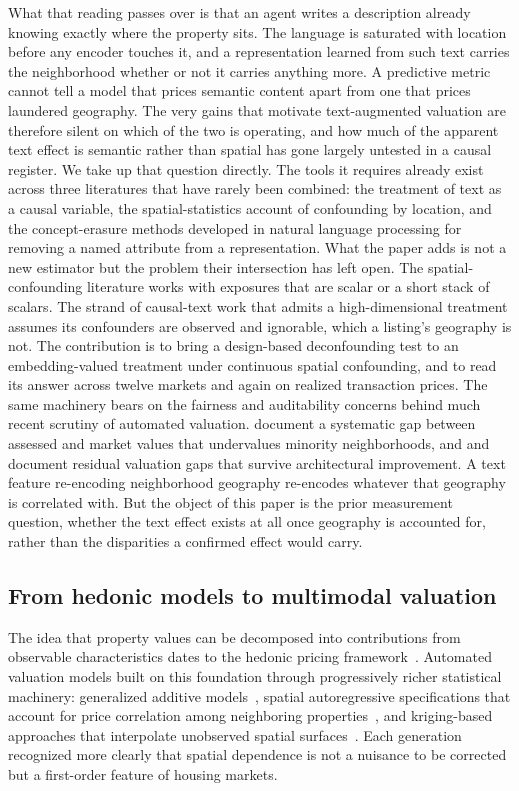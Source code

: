 \documentclass{article}
\begin{document}
What that reading passes over is that an agent writes a description already knowing exactly where the property sits. The language is saturated with location before any encoder touches it, and a representation learned from such text carries the neighborhood whether or not it carries anything more. A predictive metric cannot tell a model that prices semantic content apart from one that prices laundered geography. The very gains that motivate text-augmented valuation are therefore silent on which of the two is operating, and how much of the apparent text effect is semantic rather than spatial has gone largely untested in a causal register. We take up that question directly. The tools it requires already exist across three literatures that have rarely been combined: the treatment of text as a causal variable, the spatial-statistics account of confounding by location, and the concept-erasure methods developed in natural language processing for removing a named attribute from a representation. What the paper adds is not a new estimator but the problem their intersection has left open. The spatial-confounding literature works with exposures that are scalar or a short stack of scalars. The strand of causal-text work that admits a high-dimensional treatment assumes its confounders are observed and ignorable, which a listing's geography is not. The contribution is to bring a design-based deconfounding test to an embedding-valued treatment under continuous spatial confounding, and to read its answer across twelve markets and again on realized transaction prices. The same machinery bears on the fairness and auditability concerns behind much recent scrutiny of automated valuation. \citet{avenancio2022assessment} document a systematic gap between assessed and market values that undervalues minority neighborhoods, and \citet{zhu2024racial} and \citet{guo2025racial} document residual valuation gaps that survive architectural improvement. A text feature re-encoding neighborhood geography re-encodes whatever that geography is correlated with. But the object of this paper is the prior measurement question, whether the text effect exists at all once geography is accounted for, rather than the disparities a confirmed effect would carry.

\subsection{From hedonic models to multimodal valuation}

The idea that property values can be decomposed into contributions from observable characteristics dates to the hedonic pricing framework~\citep{rosen1974hedonic,sheppard1999hedonic}. Automated valuation models built on this foundation through progressively richer statistical machinery: generalized additive models~\citep{gloudemans1999mass}, spatial autoregressive specifications that account for price correlation among neighboring properties~\citep{pace1998sparse,can1992specification}, and kriging-based approaches that interpolate unobserved spatial surfaces~\citep{bourassa2010predicting}. Each generation recognized more clearly that spatial dependence is not a nuisance to be corrected but a first-order feature of housing markets.
\end{document}
